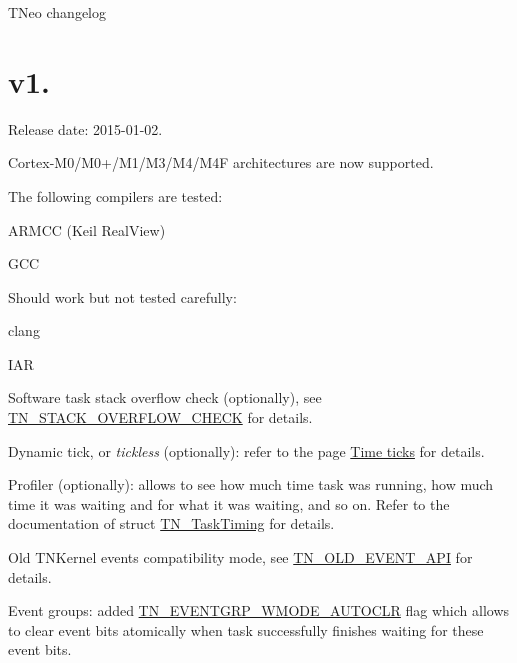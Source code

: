 T\+Neo changelog\hypertarget{changelog_changelog_v1_05}{}\section{v1.}\label{changelog_changelog_v1_05}
Release date\+: 2015-\/01-\/02.


\begin{DoxyItemize}
\item Cortex-\/\+M0/\+M0+/\+M1/\+M3/\+M4/\+M4\+F architectures are now supported.
\begin{DoxyItemize}
\item The following compilers are tested\+:
\begin{DoxyItemize}
\item A\+R\+M\+C\+C (Keil Real\+View)
\item G\+C\+C
\end{DoxyItemize}
\item Should work but not tested carefully\+:
\begin{DoxyItemize}
\item clang
\item I\+A\+R
\end{DoxyItemize}
\end{DoxyItemize}
\item Software task stack overflow check (optionally), see {\ttfamily \hyperlink{tn__cfg__default_8h_ac6a9bbac3b3b25d9b5bc8c21d2e09955}{T\+N\+\_\+\+S\+T\+A\+C\+K\+\_\+\+O\+V\+E\+R\+F\+L\+O\+W\+\_\+\+C\+H\+E\+C\+K}} for details.
\item Dynamic tick, or {\itshape tickless} (optionally)\+: refer to the page \hyperlink{time_ticks}{Time ticks} for details.
\item Profiler (optionally)\+: allows to see how much time task was running, how much time it was waiting and for what it was waiting, and so on. Refer to the documentation of {\ttfamily struct \hyperlink{structTN__TaskTiming}{T\+N\+\_\+\+Task\+Timing}} for details.
\item Old T\+N\+Kernel events compatibility mode, see {\ttfamily \hyperlink{tn__cfg__default_8h_ac61d5f6a716cdcab205a2c8afbde4242}{T\+N\+\_\+\+O\+L\+D\+\_\+\+E\+V\+E\+N\+T\+\_\+\+A\+P\+I}} for details.
\item Event groups\+: added {\ttfamily \hyperlink{tn__eventgrp_8h_a9d42ee61ae8da342f1cd6440b7e54bbdaf45098235d31f72a2b09e30792686573}{T\+N\+\_\+\+E\+V\+E\+N\+T\+G\+R\+P\+\_\+\+W\+M\+O\+D\+E\+\_\+\+A\+U\+T\+O\+C\+L\+R}} flag which allows to clear event bits atomically when task successfully finishes waiting for these event bits.

\end{DoxyItemize}
